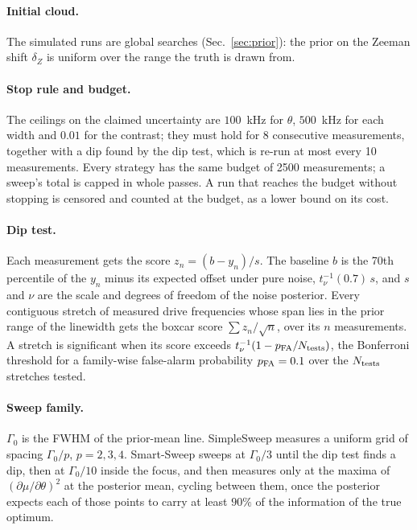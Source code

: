 \paragraph{Initial cloud.} The simulated runs are global searches (Sec.~\ref{sec:prior}): the prior on the Zeeman
shift $\delta_Z$ is uniform over the range the truth is drawn from. 

\paragraph{Stop rule and budget.} The ceilings on the claimed uncertainty are $100$~kHz for $\theta$, $500$~kHz for
each width and $0.01$ for the contrast; they must hold for 8 consecutive measurements, together with a dip found by
the dip test, which is re-run at most every 10 measurements. Every strategy has the same budget of 2500
measurements; a sweep's total is capped in whole passes. A run that reaches the budget without stopping is censored
and counted at the budget, as a lower bound on its cost.

\paragraph{Dip test.} Each measurement gets the score $z_n=(b-y_n)/s$. The baseline $b$ is the 70th percentile of
the $y_n$ minus its expected offset under pure noise, $t_\nu^{-1}(0.7)\,s$, and $s$ and $\nu$ are the scale and
degrees of freedom of the noise posterior. Every contiguous stretch of measured drive frequencies whose span lies in
the prior range of the linewidth gets the boxcar score $\sum z_n/\sqrt{n}$, over its $n$ measurements. A stretch is
significant when its score exceeds $t_\nu^{-1}(1-p_{\rm FA}/N_{\rm tests})$, the Bonferroni threshold for a
family-wise false-alarm probability $p_{\rm FA}=0.1$ over the $N_{\rm tests}$ stretches tested.

\paragraph{Sweep family.} $\Gamma_0$ is the FWHM of the prior-mean line. SimpleSweep measures a uniform grid of
spacing $\Gamma_0/p$, $p=2,3,4$. Smart-Sweep sweeps at $\Gamma_0/3$ until the dip test finds a dip, then at
$\Gamma_0/10$ inside the focus, and then measures only at the maxima of $(\partial\mu/\partial\theta)^2$ at the posterior mean, cycling
between them, once the posterior expects each of those points to carry at least $90\%$ of the information of the
true optimum.


